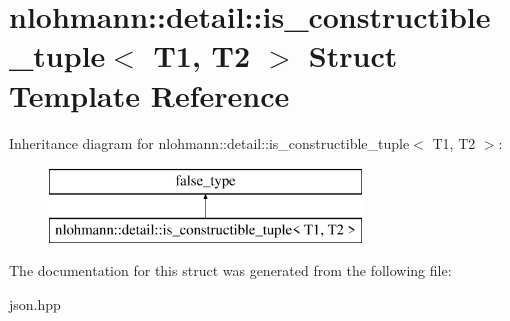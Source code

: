 \hypertarget{structnlohmann_1_1detail_1_1is__constructible__tuple}{}\section{nlohmann\+:\+:detail\+:\+:is\+\_\+constructible\+\_\+tuple$<$ T1, T2 $>$ Struct Template Reference}
\label{structnlohmann_1_1detail_1_1is__constructible__tuple}
Inheritance diagram for nlohmann\+:\+:detail\+:\+:is\+\_\+constructible\+\_\+tuple$<$ T1, T2 $>$\+:\begin{figure}[H]
\begin{center}
\leavevmode
\includegraphics[height=2.000000cm]{structnlohmann_1_1detail_1_1is__constructible__tuple}
\end{center}
\end{figure}


The documentation for this struct was generated from the following file\+:\begin{DoxyCompactItemize}
\item 
json.\+hpp\end{DoxyCompactItemize}
